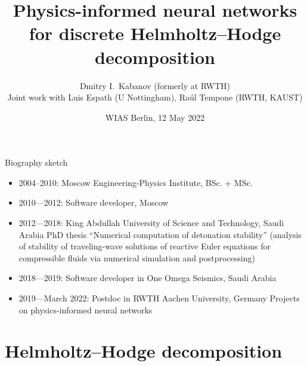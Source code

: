 \documentclass[11pt,aspectratio=169,t]{beamer}
\title{Physics-informed neural networks for discrete Helmholtz--Hodge decomposition}
\author{Dmitry I.\ Kabanov (formerly at RWTH)\\
  Joint work with Luis Espath (U Nottingham), Ra\'ul Tempone (RWTH, KAUST)}
\institute{}
\date{WIAS Berlin, 12 May 2022}
\def\\{}%
\def\titlepage{%
  \usebeamertemplate{title page}%
}
\begin{document}
\begin{frame}
\titlepage
\end{frame}

\begin{frame}{Biography sketch}
\begin{itemize}
    \item 2004–2010: Moscow Engineering-Physics Institute, BSc. + MSc.
    \item 2010—2012: Software developer, Moscow
    \item 2012—2018: King Abdullah University of Science and Technology,
          Saudi Arabia \\
          PhD thesis ``Numerical computation of detonation stability''
          (analysis of stability of traveling-wave solutions of reactive
          Euler equations for compressible fluids via numerical simulation
          and postprocessing)
    \item 2018—2019: Software developer in One Omega Seismics, Saudi Arabia
    \item 2019—March 2022: Postdoc in RWTH Aachen University, Germany\\
          Projects on physics-informed neural networks
\end{itemize}
\end{frame}

\section{Helmholtz--Hodge decomposition}
\end{document}

